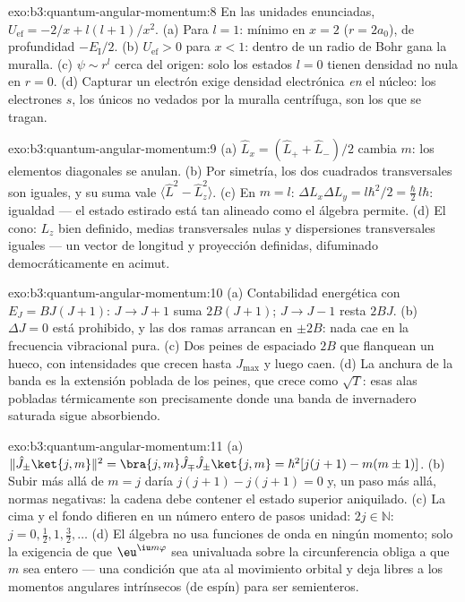 \begin{solution}{exo:b3:quantum-angular-momentum:8}
En las unidades enunciadas, $U_{\text{ef}} = -2/x + l(l+1)/x^2$. (a) Para
$l = 1$: mínimo en $x = 2$ ($r = 2a_0$), de profundidad $-E_{\text{I}}/2$.
(b) $U_{\text{ef}} > 0$ para $x < 1$: dentro de un radio de Bohr gana la
muralla. (c) $\psi \sim r^l$ cerca del origen: solo los estados $l = 0$
tienen densidad no nula en $r = 0$. (d) Capturar un electrón exige densidad
electrónica \emph{en} el núcleo: los electrones $s$, los únicos no vedados
por la muralla centrífuga, son los que se tragan.
\end{solution}

\begin{solution}{exo:b3:quantum-angular-momentum:9}
(a) $\hat L_x = (\hat L_+ + \hat L_-)/2$ cambia $m$: los elementos
diagonales se anulan. (b) Por simetría, los dos cuadrados transversales son
iguales, y su suma vale $\langle\hat L^2 - \hat L_z^2\rangle$. (c)
En $m = l$: $\Delta L_x\Delta L_y = l\hbar^2/2 = \tfrac\hbar2
\,l\hbar$: igualdad --- el estado estirado está tan alineado como el
álgebra permite. (d) El cono: $L_z$ bien definido, medias transversales
nulas y dispersiones transversales iguales --- un vector de longitud y
proyección definidas, difuminado democráticamente en acimut.
\end{solution}

\begin{solution}{exo:b3:quantum-angular-momentum:10}
(a) Contabilidad energética con $E_J = BJ(J+1)$: $J \to J + 1$ suma
$2B(J+1)$; $J \to J - 1$ resta $2BJ$. (b) $\Delta J = 0$ está
prohibido, y las dos ramas arrancan en $\pm 2B$: nada cae en
la frecuencia vibracional pura. (c) Dos peines de espaciado $2B$
que flanquean un hueco, con intensidades que crecen hasta $J_{\max}$ y luego
caen. (d) La anchura de la banda es la extensión poblada de los peines, que
crece como $\sqrt{T}$: esas alas pobladas térmicamente son precisamente
donde una banda de invernadero saturada sigue absorbiendo.
\end{solution}

\begin{solution}{exo:b3:quantum-angular-momentum:11}
(a) $\|\hat J_\pm\ket{j,m}\|^2 = \bra{j,m}\hat J_\mp\hat J_\pm
\ket{j,m} = \hbar^2[j(j+1) - m(m\pm1)]$. (b) Subir más allá de $m = j$
daría $j(j+1) - j(j+1) = 0$ y, un paso más allá, normas negativas:
la cadena debe contener el estado superior aniquilado. (c) La
cima y el fondo difieren en un número entero de pasos unidad: $2j \in
\mathbb N$: $j = 0, \tfrac12, 1, \tfrac32, \dots$ (d) El álgebra
no usa funciones de onda en ningún momento; solo la exigencia de que
$\eu^{\iu m\varphi}$ sea univaluada sobre la circunferencia obliga a que $m$
sea entero --- una condición que ata al movimiento orbital y deja libres a
los momentos angulares intrínsecos (de espín) para ser semienteros.
\end{solution}

